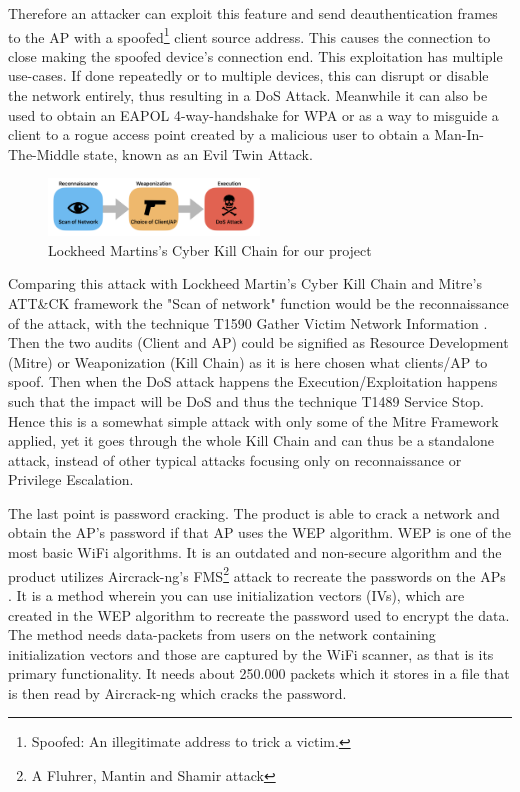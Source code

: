 Therefore an attacker can exploit this feature and send deauthentication frames to the AP with a spoofed\footnote{Spoofed: An illegitimate address to trick a victim.} client source address. This causes the connection to close making the spoofed device's connection end. This exploitation has multiple use-cases. If done repeatedly or to multiple devices, this can disrupt or disable the network entirely, thus resulting in a DoS Attack. Meanwhile it can also be used to obtain an EAPOL 4-way-handshake for WPA or as a way to misguide a client to a rogue access point created by a malicious user to obtain a Man-In-The-Middle state, known as an Evil Twin Attack. 

\begin{figure}[!htbp]
    \centering
    \includegraphics[width=0.5\textwidth]{Latex-Files/Billeder/Lockheed Martin.png}
    \caption{Lockheed Martins's Cyber Kill Chain for our project}
    \label{kill-chain}
\end{figure}


Comparing this attack with Lockheed Martin's Cyber Kill Chain and Mitre's ATT\&CK framework the "Scan of network" function would be the reconnaissance of the attack, with the technique T1590 Gather Victim Network Information \cite{lockheed} \cite{Mitre}. Then the two audits (Client and AP) could be signified as Resource Development (Mitre) or Weaponization (Kill Chain) as it is here chosen what clients/AP to spoof. Then when the DoS attack happens the Execution/Exploitation happens such that the impact will be DoS and thus the technique T1489  Service Stop.  Hence this is a somewhat simple attack with only some of the Mitre Framework applied, yet it goes through the whole Kill Chain and can thus be a standalone attack, instead of other typical attacks focusing only on reconnaissance or Privilege Escalation.

The last point is password cracking. The product is able to crack a network and obtain the AP's password if that AP uses the WEP algorithm. WEP is one of the most basic WiFi algorithms. It is an outdated and non-secure algorithm and the product utilizes Aircrack-ng's FMS\footnote{A Fluhrer, Mantin and Shamir attack} attack to recreate the passwords on the APs \cite{aircrack-ng} \cite{Weakness}. It is a method wherein you can use initialization vectors (IVs), which are created in the WEP algorithm to recreate the password used to encrypt the data. The method needs data-packets from users on the network containing initialization vectors and those are captured by the WiFi scanner, as that is its primary functionality. It needs about 250.000 packets which it stores in a file that is then read by Aircrack-ng which cracks the password. 

